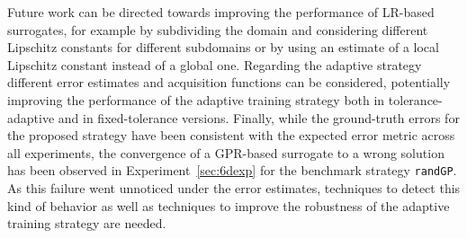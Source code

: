 Future work can be directed towards improving the performance of LR-based surrogates, for example by subdividing the domain and considering different Lipschitz constants for different subdomains or by using an estimate of a local Lipschitz constant instead of a global one. 
Regarding the adaptive strategy different error estimates and acquisition functions can be considered, potentially improving the performance of the adaptive training strategy both in tolerance-adaptive and in fixed-tolerance versions.
Finally, while the ground-truth errors for the proposed strategy have been consistent with the expected error metric across all experiments, the convergence of a GPR-based surrogate to a wrong solution has been observed in Experiment~\ref{sec:6dexp} for the benchmark strategy \texttt{randGP}.
As this failure went unnoticed under the error estimates, techniques to detect this kind of behavior as well as techniques to improve the robustness of the adaptive training strategy are needed.